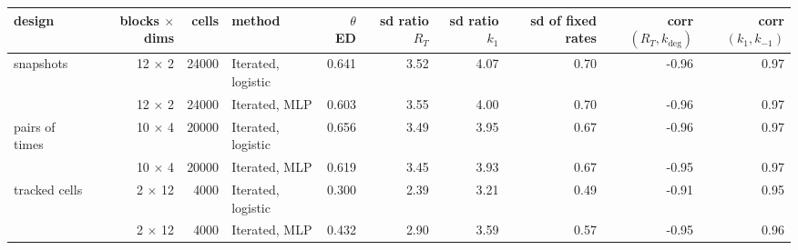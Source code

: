 \begin{tabular}{lrrlrrrrrr}
\toprule
design & blocks $\times$ dims & cells & method & $\theta$ ED & sd ratio $R_T$ & sd ratio $k_1$ & sd of fixed rates & corr$(R_T, k_\mathrm{deg})$ & corr$(k_1, k_{-1})$ \\
\midrule
snapshots & 12 $\times$ 2 & 24000 & Iterated, logistic & 0.641 & 3.52 & 4.07 & 0.70 & -0.96 & 0.97 \\
 & 12 $\times$ 2 & 24000 & Iterated, MLP & 0.603 & 3.55 & 4.00 & 0.70 & -0.96 & 0.97 \\
pairs of times & 10 $\times$ 4 & 20000 & Iterated, logistic & 0.656 & 3.49 & 3.95 & 0.67 & -0.96 & 0.97 \\
 & 10 $\times$ 4 & 20000 & Iterated, MLP & 0.619 & 3.45 & 3.93 & 0.67 & -0.95 & 0.97 \\
tracked cells & 2 $\times$ 12 & 4000 & Iterated, logistic & 0.300 & 2.39 & 3.21 & 0.49 & -0.91 & 0.95 \\
 & 2 $\times$ 12 & 4000 & Iterated, MLP & 0.432 & 2.90 & 3.59 & 0.57 & -0.95 & 0.96 \\
\bottomrule
\end{tabular}
